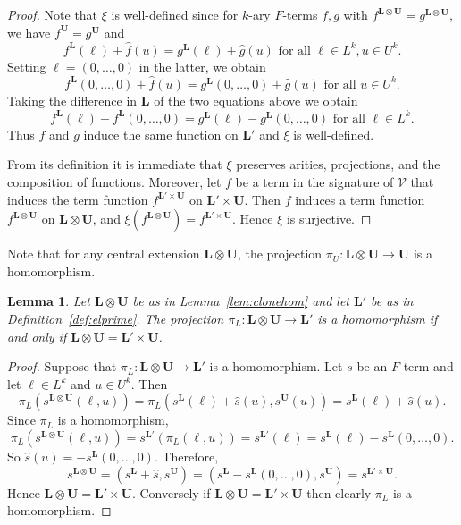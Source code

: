 \documentclass[12pt]{amsart}
\numberwithin{equation}{section}
\theoremstyle{plain}
\newtheorem{lemma}[theorem]{Lemma}
\theoremstyle{definition}
\renewcommand{\L}{\mathbf{L}}
\newcommand{\U}{\mathbf{U}}
\newcommand{\V}{\mathcal{V}}
\begin{document}
\begin{proof}  
  Note that $\xi$ is well-defined since for $k$-ary $F$-terms $f,g$ with 
    $f^{\L\otimes \U} = g^{\L\otimes \U}$, we have $f^\U=g^\U$ and
    \[ f^\L(\ell)+\hat{f}(u) = g^\L(\ell)+\hat{g}(u) \text{ for all } \ell\in L^k, u\in U^k. \]
  Setting $\ell = (0,\dots,0)$ in the latter, we obtain
    \[ f^\L(0,\dots,0)+\hat{f}(u) = g^\L(0,\dots,0) +\hat{g}(u) \text{ for all } u\in U^k. \]
  Taking the difference in $\L$ of the two equations above we obtain
    \[ f^\L(\ell) - f^\L(0,\dots,0) = g^\L(\ell)-g^\L(0,\dots,0) \text{ for all } \ell\in L^k. \]
  Thus $f$ and $g$ induce the same function on $\L'$ and $\xi$ is well-defined.
 
  From its definition it is immediate that $\xi$ preserves arities, projections, and the composition of functions.  
  Moreover, let $f$ be a term in the signature of $\V$ that induces the term function 
    $f^{\L' \times \U}$ on $\L' \times \U$. 
  Then $f$ induces a term function $f^{\L \otimes \U}$ on $\L \otimes \U$, and 
    $\xi(f^{\L \otimes \U}) = f^{\L' \times \U}$.
  Hence $\xi$ is surjective.
\end{proof}

Note that  for any central extension $\L \otimes \U$, the projection 
  $\pi_U \colon \L \otimes \U \rightarrow \U$ is a homomorphism.

\begin{lemma} \label{lem:injective} 
  Let $\L \otimes \U$  be as in Lemma~\ref{lem:clonehom} and let $\L'$ be as in Definition~\ref{def:elprime}.
  The projection $\pi_L \colon \L \otimes \U \rightarrow \L'$ is a homomorphism if and only if 
    $\L \otimes \U = \L' \times \U$. 
\end{lemma}

\begin{proof}
  Suppose that $\pi_L \colon \L \otimes \U \rightarrow \L'$ is a homomorphism.
  Let $s$  be an $F$-term and let $\ell \in L^k$ and $u \in U^k$.
  Then 
    \[ \pi_L(s^{\L \otimes \U}(\ell,u))  = \pi_L(s^\L(\ell) + \hat{s}(u), s^\U(u))  = s^\L(\ell) + \hat{s}(u). \]
  Since $\pi_L$ is a homomorphism, 
    \[\pi_L(s^{\L \otimes \U}(\ell,u)) = s^{\L'}(\pi_L(\ell, u)) = s^{\L'}(\ell)= s^\L(\ell) - s^\L(0, \ldots,0).\]
  So $\hat{s}(u) = -s^\L(0, \ldots,0)$.
  Therefore,
    \[ s^{\L \otimes \U} = (s^\L + \hat{s}, s^\U) = (s^\L - s^\L(0, \ldots, 0), s^\U) = s^{\L' \times \U}. \]
  Hence $\L \otimes \U = \L' \times \U$.
  Conversely if $\L \otimes \U = \L' \times \U$ then clearly $\pi_L$ is a homomorphism. 
\end{proof}
\end{document}
